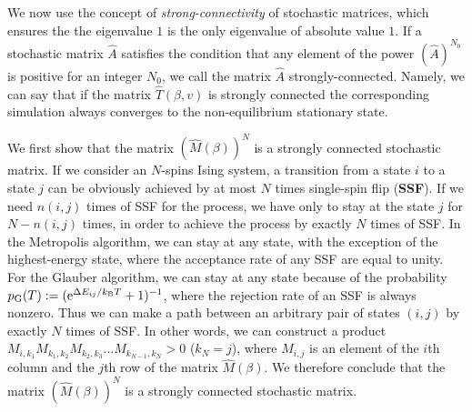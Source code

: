 We now use the concept of \textit{strong-connectivity} of stochastic matrices, which ensures the the eigenvalue $1$ is the only eigenvalue of absolute value $1$. If a stochastic matrix $\hat{A}$ satisfies the condition that any element of the power $\left(\hat{A}\right)^{N_{0}}$ is positive for an integer $N_{0}$, we call the matrix $\hat{A}$ strongly-connected. Namely, we can say that if the matrix $\hat{T}(\beta,v)$ is strongly connected the corresponding simulation always converges to the non-equilibrium stationary state.


We first show that the matrix $\left(\hat{M}(\beta)\right)^{N}$ is a strongly connected stochastic matrix. If we consider an $N$-spins Ising system, a transition from a state $i$ to a state $j$ can be obviously achieved by at most $N$ times single-spin flip (\textbf{SSF}). If we need $n(i,j)$ times of SSF for the process, we have only to stay at the state $j$ for $N-n(i,j)$ times, in order to achieve the process by exactly $N$ times of SSF. In the Metropolis algorithm, we can stay at any state, with the exception of the highest-energy state, where the acceptance rate of any SSF are equal to unity. For the Glauber algorithm, we can stay at any state because of the probability $p_{\rm G}(T):=(\mathrm{e}^{\Delta E_{ij}/k_{\rm B}T}+1)^{-1}$, where the rejection rate of an SSF is always nonzero. Thus we can make a path between an arbitrary pair of states $(i,j)$ by exactly $N$ times of SSF. In other words, we can construct a product $M_{i,k_{1}}M_{k_{1},k_{2}}M_{k_{2},k_{3}}\dots M_{k_{N-1},k_{N}} > 0$ ($k_{N}=j$), where $M_{i,j}$ is an element of the $i$th column and the $j$th row of the matrix $\hat{M}(\beta)$. We therefore conclude that the matrix $\left(\hat{M}(\beta)\right)^{N}$ is a strongly connected stochastic matrix.

